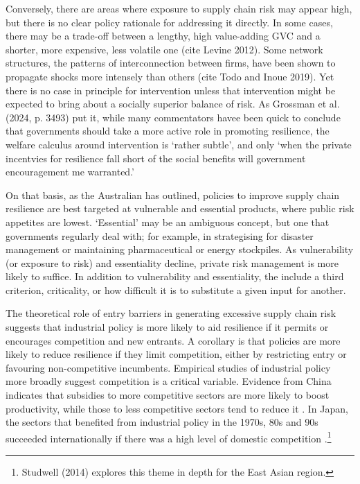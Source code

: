 \documentclass{article}
\begin{document}
Conversely, there are areas where exposure to supply chain risk may appear high, but there is no clear policy rationale for addressing it directly. In some cases, there may be a trade-off between a lengthy, high value-adding GVC and a shorter, more expensive, less volatile one (cite Levine 2012). Some network structures, the patterns of interconnection between firms, have been shown to propagate shocks more intensely than others (cite Todo and Inoue 2019). Yet there is no case in principle for intervention unless that intervention might be expected to bring about a socially superior balance of risk. As Grossman et al. (2024, p. 3493) put it, while many commentators havee been quick to conclude that governments should take a more active role in promoting resilience, the welfare calculus around intervention is `rather subtle', and only `when the private incentvies for resilience fall short of the social benefits will government encouragement me warranted.'

On that basis, as the Australian \textcite{productivity_commission_vulnerable_2021} has outlined, policies to improve supply chain resilience are best targeted at vulnerable and essential products, where public risk appetites are lowest. `Essential' may be an ambiguous concept, but one that governments regularly deal with; for example, in strategising for disaster management or maintaining pharmaceutical or energy stockpiles. As vulnerability (or exposure to risk) and essentiality decline, private risk management is more likely to suffice. In addition to vulnerability and essentiality, the \textcite{productivity_commission_vulnerable_2021} include a third criterion, criticality, or how difficult it is to substitute a given input for another.

The theoretical role of entry barriers in generating excessive supply chain risk suggests that industrial policy is more likely to aid resilience if it permits or encourages competition and new entrants. A corollary is that policies are more likely to reduce resilience if they limit competition, either by restricting entry or favouring non-competitive incumbents. Empirical studies of industrial policy more broadly suggest competition is a critical variable. Evidence from China indicates that subsidies to more competitive sectors are more likely to boost productivity, while those to less competitive sectors tend to reduce it \parencite{aghion_industrial_2015}. In Japan, the sectors that benefited from industrial policy in the 1970s, 80s and 90s succeeded internationally if there was a high level of domestic competition \parencite{porter_competition_2004}.\footnote{Studwell (2014) explores this theme in depth for the East Asian region.}
\end{document}
